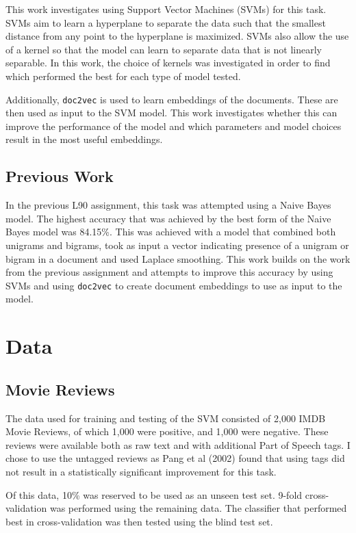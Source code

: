 \documentclass[twocolumn]{article}
\begin{document}
This work investigates using Support Vector Machines (SVMs) for this task. SVMs aim to learn a hyperplane to separate the data such that the smallest distance from any point to the hyperplane is maximized. SVMs also allow the use of a kernel so that the model can learn to separate data that is not linearly separable. In this work, the choice of kernels was investigated in order to find which performed the best for each type of model tested.

Additionally, \texttt{doc2vec} is used to learn embeddings of the documents. These are then used as input to the SVM model. This work investigates whether this can improve the performance of the model and which parameters and model choices result in the most useful embeddings.

\subsection{Previous Work}


In the previous L90 assignment, this task was attempted using a Naive Bayes model. The highest accuracy that was achieved by the best form of the Naive Bayes model was 84.15\%. This was achieved with a model that combined both unigrams and bigrams, took as input a vector indicating presence of a unigram or bigram in a document and used Laplace smoothing. This work builds on the work from the previous assignment and attempts to improve this accuracy by using SVMs and using \texttt{doc2vec} to create document embeddings to use as input to the model.

\section{Data}


\subsection{Movie Reviews}


The data used for training and testing of the SVM consisted of 2,000 IMDB Movie Reviews, of which 1,000 were positive, and 1,000 were negative. These reviews were available both as raw text and with additional Part of Speech tags. I chose to use the untagged reviews as Pang et al (2002) \cite{pang} found that using tags did not result in a statistically significant improvement for this task. 

Of this data, 10\% was reserved to be used as an unseen test set. 9-fold cross-validation was performed using the remaining data. The classifier that performed best in cross-validation was then tested using the blind test set.
\end{document}
